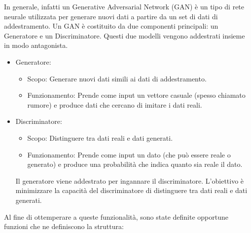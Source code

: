 \documentclass[12pt,a4paper,openright,twoside]{book}
\begin{document}
In generale, infatti un Generative Adversarial Network (GAN) è un tipo di rete neurale utilizzata per generare nuovi dati a partire da un set di dati di addestramento. Un GAN è costituito da due componenti principali: un Generatore e un Discriminatore. Questi due modelli vengono addestrati insieme in modo antagonista.
\begin{itemize}
\item Generatore:
\begin{itemize}
\item Scopo: Generare nuovi dati simili ai dati di addestramento.
\item Funzionamento: Prende come input un vettore casuale (spesso chiamato rumore) e produce dati che cercano di imitare i dati reali.
\end{itemize}
\item Discriminatore:
\begin{itemize}
\item Scopo: Distinguere tra dati reali e dati generati.
\item Funzionamento: Prende come input un dato (che può essere reale o generato) e produce una probabilità che indica quanto sia reale il dato.
\end{itemize}
Il generatore viene addestrato per ingannare il discriminatore. L'obiettivo è minimizzare la capacità del discriminatore di distinguere tra dati reali e dati generati.\\
\end{itemize}
Al fine di ottemperare a queste funzionalità, sono state definite opportune funzioni che ne definiscono la struttura:
\end{document}
